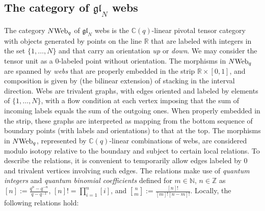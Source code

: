 \documentclass[11pt]{article}
\theoremstyle{definition}
\providecommand{\qbinom}[2]{\genfrac{[}{]}{0pt}{}{#1}{#2}}
\numberwithin{equation}{section}
\newcommand{\glnn}[1]{\mf{gl}_{#1}}
\def\mf{\mathfrak}
\def\C{{\mathbb C}}
\def\N{{\mathbb N}}
\def\R{{\mathbb R}}
\def\Z{{\mathbb Z}}
\newcommand{\cat}[1]{\ensuremath{\mbox{\bfseries {\upshape {#1}}}}}
\newcommand{\Webq}[1][]{#1\cat{Web}_{q}}
\begin{document}
\subsection{The category of \texorpdfstring{$\glnn{N}$}{gl(N)} webs}
\label{sec:webs}
The category $\Webq[N]$ of $\glnn{N}$ webs is the $\C(q)$-linear pivotal tensor
category with objects generated by points on the line $\R$ that are labeled with
integers in the set $\{1,\dots,N\}$ and that carry an orientation \textit{up} or
\textit{down}. We may consider the tensor unit as a $0$-labeled point without
orientation. The morphisms in $\Webq[N]$ are spanned by \textit{webs} that are
properly embedded in the strip $\R\times [0,1]$, and composition is given by
(the bilinear extension) of stacking in the interval direction. Webs are
trivalent graphs, with edges oriented and labeled by elements of
$\{1,\dots,N\}$, with a flow condition at each vertex imposing that the sum of
incoming labels equals the sum of the outgoing ones. When properly embedded in
the strip, these graphs are interpreted as mapping from the bottom sequence of
boundary points (with labels and orientations) to that at the top. The morphisms
in $\Webq[N]$, represented by $\C(q)$-linear combinations of webs, are
considered modulo isotopy relative to the boundary and subject to certain local
relations. To describe the relations, it is convenient to temporarily allow
edges labeled by $0$ and trivalent vertices involving such edges. The relations
make use of \textit{quantum integers} and \textit{quantum binomial coefficients}
defined for $m\in \N$, $n \in \Z$ as $[n]:=\frac{q^n-q^{-n}}{q-q^{-1}}$,
$[n]!=\prod_{i=1}^n [i]$, and $\qbinom{n}{m}:=\frac{[n]!}{[m]![n-m]!}$. Locally, the following relations hold:
\end{document}
